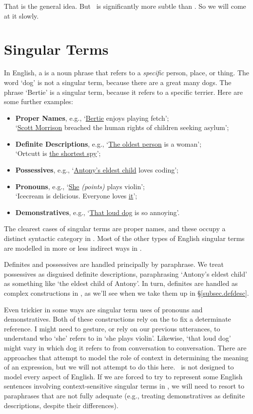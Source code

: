 That is the general idea. But \FOL\ is significantly more subtle than \TFL. So we will come at it slowly. 


\section{Singular Terms} %
\label{sec:singular_terms}

In English, a  is a noun phrase that refers to a \emph{specific} person, place, or thing.  The word `dog' is not a singular term, because there are a great many dogs. The phrase `Bertie' is a singular term, because it refers to a specific terrier. Here are some further examples:
\begin{itemize}
	\item \textbf{Proper Names}, e.g., `\underline{Bertie} enjoys playing fetch';\\
	`\underline{Scott Morrison} breached the human rights of children seeking asylum'; 
	\item \textbf{Definite Descriptions}, e.g., `\underline{The oldest person} is a woman';\\ `Ortcutt is \underline{the shortest spy}';
	\item \textbf{Possessives}, e.g., `\underline{Antony's eldest child} loves coding';
	\item \textbf{Pronouns}, e.g., `\underline{She} \emph{(points)} plays violin';\\
	`Icecream is delicious. Everyone loves \underline{it}';
	\item \textbf{Demonstratives}, e.g., `\underline{That loud dog} is so annoying'.
\end{itemize} The clearest cases of singular terms are proper names, and these occupy a distinct syntactic category in \FOL. Most of the other types of English singular terms are modelled in more or less indirect ways in \FOL.

Definites and possessives are handled principally by paraphrase. We treat possessives as disguised definite descriptions, paraphrasing `Antony's eldest child' as something like `the eldest child of Antony'. In turn, definites are handled as complex constructions in \FOL, as we'll see when we take them up in §\ref{subsec.defdesc}.

Even trickier in some ways are singular term uses of pronouns and demonstratives. Both of these constructions rely on the  to fix a determinate reference. I might need to gesture, or rely on our previous utterances, to understand who `she' refers to in `she plays violin'. Likewise, `that loud dog' might vary in which dog it refers to from conversation to conversation. There are approaches that attempt to model the role of context in determining the meaning of an expression, but we will not attempt to do this here.  \FOL\ is not designed to model every aspect of English. If we are forced to try to represent some English sentences involving context-sensitive singular terms in \FOL, we will need to resort to paraphrases that are not fully adequate (e.g., treating demonstratives as definite descriptions, despite their differences).

